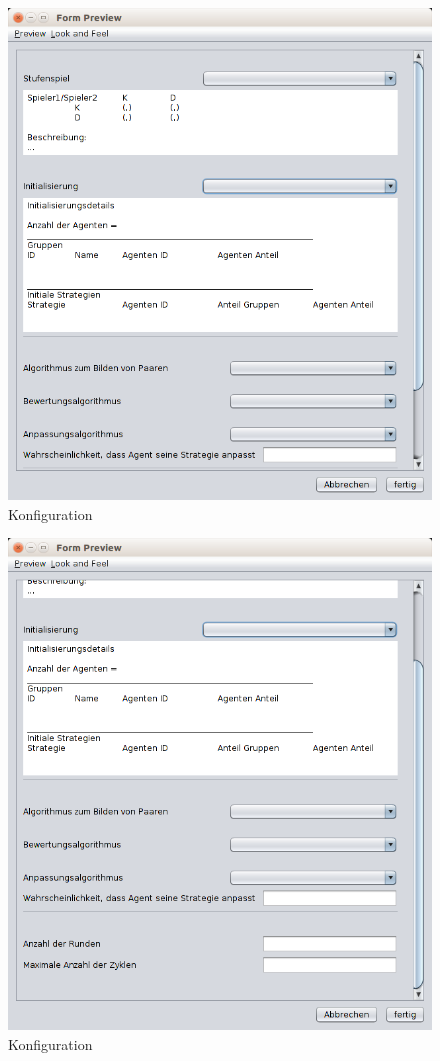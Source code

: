 \begin{figure}[hp] 
  \centering
     \includegraphics[width=1.0\textwidth]{GUI_Entwurf/NeueKonfiguration1.png}
  \caption{Konfiguration}
  \label{fig:Bild2}
\end{figure}

\begin{figure}[hp] 
  \centering
     \includegraphics[width=1.0\textwidth]{GUI_Entwurf/NeueKonfiguration2.png}
  \caption{Konfiguration}
  \label{fig:Bild2}
\end{figure}

